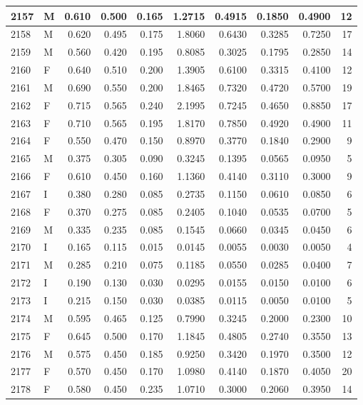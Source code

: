 \documentclass[9pt,twocolumn,twoside,]{pnas-new}
\begin{document}
\begin{tabular}{l|l|r|r|r|r|r|r|r|r}
\hline
2157 & M & 0.610 & 0.500 & 0.165 & 1.2715 & 0.4915 & 0.1850 & 0.4900 & 12\\
\hline
2158 & M & 0.620 & 0.495 & 0.175 & 1.8060 & 0.6430 & 0.3285 & 0.7250 & 17\\
\hline
2159 & M & 0.560 & 0.420 & 0.195 & 0.8085 & 0.3025 & 0.1795 & 0.2850 & 14\\
\hline
2160 & F & 0.640 & 0.510 & 0.200 & 1.3905 & 0.6100 & 0.3315 & 0.4100 & 12\\
\hline
2161 & M & 0.690 & 0.550 & 0.200 & 1.8465 & 0.7320 & 0.4720 & 0.5700 & 19\\
\hline
2162 & F & 0.715 & 0.565 & 0.240 & 2.1995 & 0.7245 & 0.4650 & 0.8850 & 17\\
\hline
2163 & F & 0.710 & 0.565 & 0.195 & 1.8170 & 0.7850 & 0.4920 & 0.4900 & 11\\
\hline
2164 & F & 0.550 & 0.470 & 0.150 & 0.8970 & 0.3770 & 0.1840 & 0.2900 & 9\\
\hline
2165 & M & 0.375 & 0.305 & 0.090 & 0.3245 & 0.1395 & 0.0565 & 0.0950 & 5\\
\hline
2166 & F & 0.610 & 0.450 & 0.160 & 1.1360 & 0.4140 & 0.3110 & 0.3000 & 9\\
\hline
2167 & I & 0.380 & 0.280 & 0.085 & 0.2735 & 0.1150 & 0.0610 & 0.0850 & 6\\
\hline
2168 & F & 0.370 & 0.275 & 0.085 & 0.2405 & 0.1040 & 0.0535 & 0.0700 & 5\\
\hline
2169 & M & 0.335 & 0.235 & 0.085 & 0.1545 & 0.0660 & 0.0345 & 0.0450 & 6\\
\hline
2170 & I & 0.165 & 0.115 & 0.015 & 0.0145 & 0.0055 & 0.0030 & 0.0050 & 4\\
\hline
2171 & M & 0.285 & 0.210 & 0.075 & 0.1185 & 0.0550 & 0.0285 & 0.0400 & 7\\
\hline
2172 & I & 0.190 & 0.130 & 0.030 & 0.0295 & 0.0155 & 0.0150 & 0.0100 & 6\\
\hline
2173 & I & 0.215 & 0.150 & 0.030 & 0.0385 & 0.0115 & 0.0050 & 0.0100 & 5\\
\hline
2174 & M & 0.595 & 0.465 & 0.125 & 0.7990 & 0.3245 & 0.2000 & 0.2300 & 10\\
\hline
2175 & F & 0.645 & 0.500 & 0.170 & 1.1845 & 0.4805 & 0.2740 & 0.3550 & 13\\
\hline
2176 & M & 0.575 & 0.450 & 0.185 & 0.9250 & 0.3420 & 0.1970 & 0.3500 & 12\\
\hline
2177 & F & 0.570 & 0.450 & 0.170 & 1.0980 & 0.4140 & 0.1870 & 0.4050 & 20\\
\hline
2178 & F & 0.580 & 0.450 & 0.235 & 1.0710 & 0.3000 & 0.2060 & 0.3950 & 14\\

\end{tabular}
\end{document}
